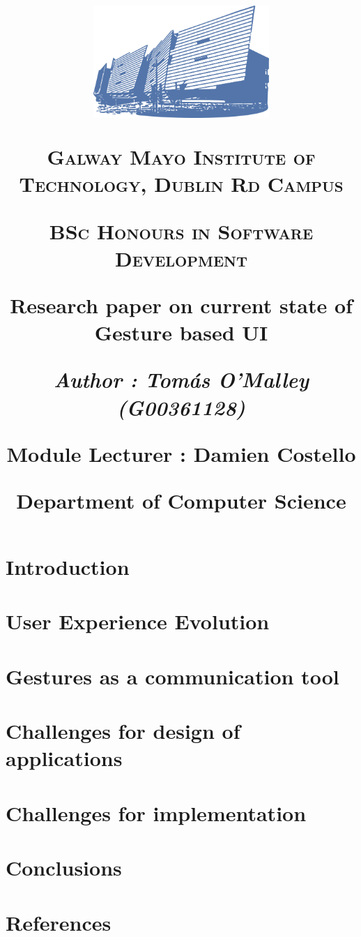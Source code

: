 \documentclass[11pt,twoside]{report}
\title{



{\includegraphics[width=0.5\textwidth]{gmit.png}}


        \vspace{0.25cm}
        {\scshape\LARGE Galway Mayo Institute of Technology, Dublin Rd Campus \par}
        \vspace{0.25cm}
        {\scshape\Large BSc  Honours in Software Development \par}
        \vspace{0.5cm}

        {\Large\bfseries Research paper on current state of Gesture based UI\par}
        
        \vspace{0.5cm}
        {\Large\itshape  Author : Tomás O'Malley (G00361128) \par}
        \vspace{0.25cm}

\vspace{1cm}
Module Lecturer : Damien Costello \par
Department of Computer Science \par
\vspace{1.5cm}
\large
}
\begin{document}
\maketitle 


\tableofcontents
\chapter{ Introduction }




\chapter{User Experience Evolution}


\chapter{Gestures as a communication tool }


\chapter{Challenges for design of applications}


\chapter{Challenges for implementation}


\chapter{Conclusions}


\chapter{References}

\end{document}

